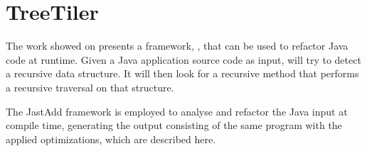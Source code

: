 \section{TreeTiler}
\label{sec:tiler}

The work showed on \cite{tree_tiler} presents a framework, \treetiler, that can be used to refactor Java code at runtime. Given a Java application source code as input, \treetiler will try to detect a recursive data structure. It will then look for a recursive method that performs a recursive traversal on that structure.

The JastAdd framework is employed to analyse and refactor the Java input at compile time, generating the output consisting of the same program with the applied optimizations, which are described here.

